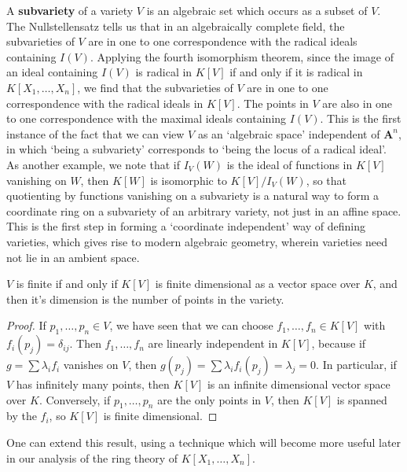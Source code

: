 A {\bf subvariety} of a variety $V$ is an algebraic set which occurs as a subset of $V$. The Nullstellensatz tells us that in an algebraically complete field, the subvarieties of $V$ are in one to one correspondence with the radical ideals containing $I(V)$. Applying the fourth isomorphism theorem, since the image of an ideal containing $I(V)$ is radical in $K[V]$ if and only if it is radical in $K[X_1,\dots,X_n]$, we find that the subvarieties of $V$ are in one to one correspondence with the radical ideals in $K[V]$. The points in $V$ are also in one to one correspondence with the maximal ideals containing $I(V)$. This is the first instance of the fact that we can view $V$ as an `algebraic space' independent of $\mathbf{A}^n$, in which `being a subvariety' corresponds to `being the locus of a radical ideal'. As another example, we note that if $I_V(W)$ is the ideal of functions in $K[V]$ vanishing on $W$, then $K[W]$ is isomorphic to $K[V]/I_V(W)$, so that quotienting by functions vanishing on a subvariety is a natural way to form a coordinate ring on a subvariety of an arbitrary variety, not just in an affine space. This is the first step in forming a `coordinate independent' way of defining varieties, which gives rise to modern algebraic geometry, wherein varieties need not lie in an ambient space.

\begin{prop}
    $V$ is finite if and only if $K[V]$ is finite dimensional as a vector space over $K$, and then it's dimension is the number of points in the variety.
\end{prop}
\begin{proof}
    If $p_1, \dots, p_n \in V$, we have seen that we can choose $f_1, \dots, f_n \in K[V]$ with $f_i(p_j) = \delta_{ij}$. Then $f_1, \dots, f_n$ are linearly independent in $K[V]$, because if $g = \sum \lambda_i f_i$ vanishes on $V$, then $g(p_j) = \sum \lambda_i f_i(p_j) = \lambda_j = 0$. In particular, if $V$ has infinitely many points, then $K[V]$ is an infinite dimensional vector space over $K$. Conversely, if $p_1, \dots, p_n$ are the only points in $V$, then $K[V]$ is spanned by the $f_i$, so $K[V]$ is finite dimensional.
\end{proof}

One can extend this result, using a technique which will become more useful later in our analysis of the ring theory of $K[X_1, \dots, X_n]$.

